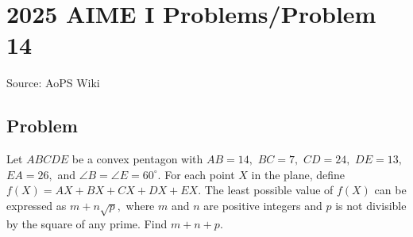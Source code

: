 \documentclass[12pt]{article}
\begin{document}
\section*{{2025 AIME I Problems/Problem 14}}
Source: AoPS Wiki

\subsection*{Problem}
Let $ABCDE$ be a convex pentagon with $AB=14,$ $BC=7,$ $CD=24,$ $DE=13,$ $EA=26,$ and $\angle B=\angle E=60^{\circ}.$ For each point $X$ in the plane, define $f(X)=AX+BX+CX+DX+EX.$ The least possible value of $f(X)$ can be expressed as $m+n\sqrt{p},$ where $m$ and $n$ are positive integers and $p$ is not divisible by the square of any prime. Find $m+n+p.$
\end{document}
